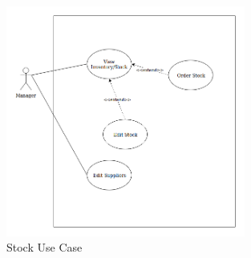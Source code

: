 \begin{figure}[!htb]
	\centering
	\includegraphics[width=0.7\textwidth]{stock_case}
	\caption{Stock Use Case}
	\label{fig:stockcase}
\end{figure}
\clearpage%
\thispagestyle{empty}%
